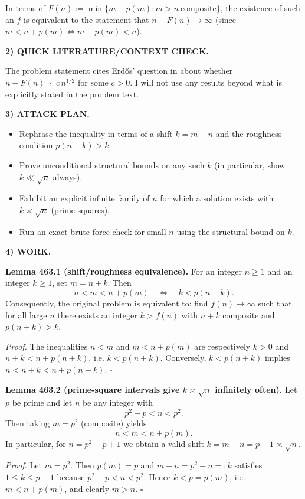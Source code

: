 In terms of $F(n):=\min\{m-p(m): m>n\ \text{composite}\}$, the existence of such an $f$ is equivalent to the statement that $n-F(n)\to\infty$ (since $m<n+p(m)\iff m-p(m)<n$).

\medskip
\noindent\textbf{2) QUICK LITERATURE/CONTEXT CHECK.}

The problem statement cites Erd\H{o}s' question in \cite{Er92e} about whether $n-F(n)\sim c\,n^{1/2}$ for some $c>0$. I will not use any results beyond what is explicitly stated in the problem text.

\medskip
\noindent\textbf{3) ATTACK PLAN.}

\begin{itemize}
\item Rephrase the inequality in terms of a shift $k=m-n$ and the roughness condition $p(n+k)>k$.
\item Prove unconditional structural bounds on any such $k$ (in particular, show $k\ll \sqrt{n}$ always).
\item Exhibit an explicit infinite family of $n$ for which a solution exists with $k\asymp \sqrt{n}$ (prime squares).
\item Run an exact brute-force check for small $n$ using the structural bound on $k$.
\end{itemize}

\medskip
\noindent\textbf{4) WORK.}

\noindent\textbf{Lemma 463.1 (shift/roughness equivalence).}
For an integer $n\ge 1$ and an integer $k\ge 1$, set $m=n+k$. Then
\[
 n<m<n+p(m)\quad\Longleftrightarrow\quad k<p(n+k).
\]
Consequently, the original problem is equivalent to: find $f(n)\to\infty$ such that for all large $n$ there exists an integer $k>f(n)$ with $n+k$ composite and $p(n+k)>k$.

\textit{Proof.}
The inequalities $n<m$ and $m<n+p(m)$ are respectively $k>0$ and $n+k<n+p(n+k)$, i.e. $k<p(n+k)$. Conversely, $k<p(n+k)$ implies $n<n+k<n+p(n+k)$. \hfill$\square$

\medskip
\noindent\textbf{Lemma 463.2 (prime-square intervals give $k\asymp\sqrt{n}$ infinitely often).}
Let $p$ be prime and let $n$ be any integer with
\[
 p^2-p<n<p^2.
\]
Then taking $m=p^2$ (composite) yields
\[
 n<m<n+p(m).
\]
In particular, for $n=p^2-p+1$ we obtain a valid shift $k=m-n=p-1\asymp \sqrt{n}$.

\textit{Proof.}
Let $m=p^2$. Then $p(m)=p$ and $m-n=p^2-n=:k$ satisfies $1\le k\le p-1$ because $p^2-p<n<p^2$. Hence $k<p=p(m)$, i.e. $m<n+p(m)$, and clearly $m>n$. \hfill$\square$

